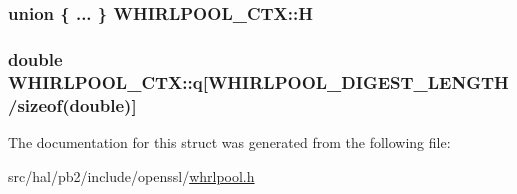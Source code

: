 \subsubsection[{\texorpdfstring{H}{H}}]{\setlength{\rightskip}{0pt plus 5cm}union \{ ... \} 	 W\+H\+I\+R\+L\+P\+O\+O\+L\+\_\+\+C\+T\+X\+::H}\hypertarget{struct_w_h_i_r_l_p_o_o_l___c_t_x_a236a1b9664b11ebc92b1d7bb8d95c95b}{}\label{struct_w_h_i_r_l_p_o_o_l___c_t_x_a236a1b9664b11ebc92b1d7bb8d95c95b}
\subsubsection[{\texorpdfstring{q}{q}}]{\setlength{\rightskip}{0pt plus 5cm}double W\+H\+I\+R\+L\+P\+O\+O\+L\+\_\+\+C\+T\+X\+::q\mbox{[}{\bf W\+H\+I\+R\+L\+P\+O\+O\+L\+\_\+\+D\+I\+G\+E\+S\+T\+\_\+\+L\+E\+N\+G\+TH}/sizeof(double)\mbox{]}}\hypertarget{struct_w_h_i_r_l_p_o_o_l___c_t_x_acb551fc520e28a3233efa1185dd09272}{}\label{struct_w_h_i_r_l_p_o_o_l___c_t_x_acb551fc520e28a3233efa1185dd09272}


The documentation for this struct was generated from the following file\+:\begin{DoxyCompactItemize}
\item 
src/hal/pb2/include/openssl/\hyperlink{whrlpool_8h}{whrlpool.\+h}\end{DoxyCompactItemize}
